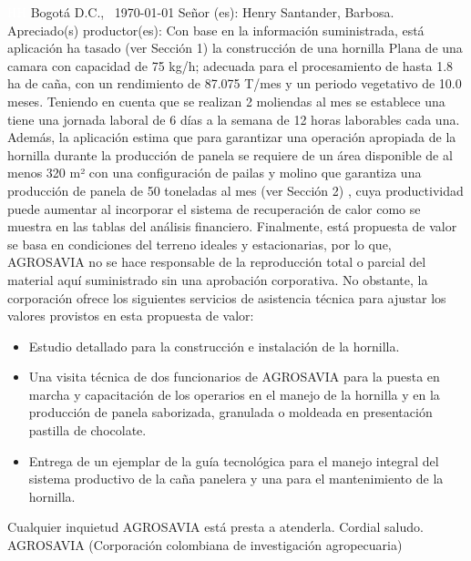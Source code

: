 \documentclass{article}%
\begin{document}
\begin{large}%
\textcolor{white}{ 
HH
}%
\linebreak%
Bogotá D.C., %
\ {\today}%
\newline%
 \newline%
%
\linebreak%
\newline%
Señor (es):%
\newline%
Henry%
\newline%
Santander, Barbosa.%
\newline%
 \newline%
%
\newline%
Apreciado(s) productor(es):%
\newline%
 \newline%
%
Con base en la información suministrada, está aplicación ha tasado (ver Sección 1) la construcción de una hornilla Plana de una camara con capacidad de 75 kg/h; adecuada para el procesamiento de hasta 1.8 ha de caña, con un rendimiento de 87.075 T/mes y un periodo vegetativo de 10.0 meses. Teniendo en cuenta que se realizan 2 moliendas al mes se establece una tiene una jornada laboral de 6 días a la semana de 12 horas laborables cada una. \newline%
 Además, la aplicación estima que para garantizar una operación apropiada de la hornilla durante la producción de panela se requiere de un área disponible de al menos 320 m² con una configuración de pailas y molino que garantiza una producción de panela de 50 toneladas al mes (ver Sección 2)%
, cuya productividad puede aumentar al incorporar el sistema de recuperación de calor como se muestra en las tablas del análisis financiero.%
\newline%
 Finalmente, está propuesta de valor se basa en condiciones del terreno ideales y estacionarias, por lo que, AGROSAVIA no se hace responsable de la reproducción total o parcial del material aquí suministrado sin una aprobación corporativa. No obstante, la corporación ofrece los siguientes servicios de asistencia técnica para ajustar los valores provistos en esta propuesta de valor:%
\begin{itemize}%
\item%
Estudio detallado para la construcción e instalación de la hornilla.%
\item%
Una visita técnica de dos funcionarios de AGROSAVIA para la puesta en marcha y capacitación de los operarios en el manejo de la hornilla y en la producción de panela saborizada, granulada o moldeada en presentación pastilla de chocolate.%
\item%
Entrega de un ejemplar de la guía tecnológica para el manejo integral del sistema productivo de la caña panelera y una para el mantenimiento de la hornilla.%
\end{itemize}%
Cualquier inquietud AGROSAVIA está presta a atenderla.\newline%
Cordial saludo.\newline%
\newline%
 \newline%
 \newline%
 \newline%
AGROSAVIA (Corporación colombiana de investigación agropecuaria)%
\end{large}%
\end{document}
